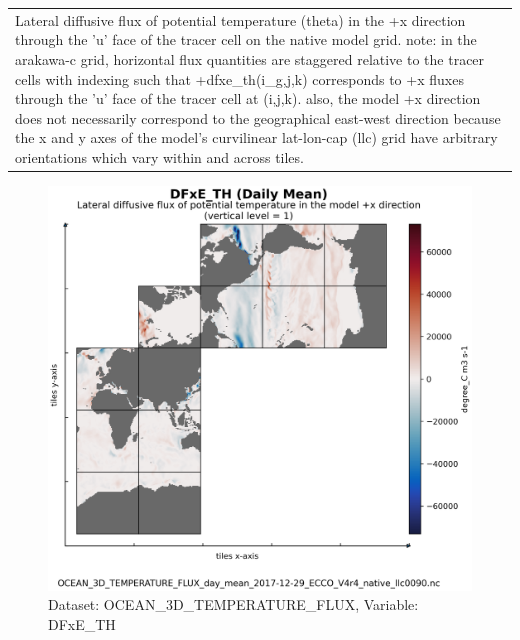 \begin{longtable}{|m{}|m{}|m{}|m{}|}
\rowcolor{lightgray} \multicolumn{4}{|c|}{\textbf{Comments}} \\ \hline
\multicolumn{4}{|p{1\textwidth}|}{\footnotesize{{Lateral diffusive flux of potential temperature (theta) in the +x direction through the 'u' face of the tracer cell on the native model grid. note: in the arakawa-c grid, horizontal flux quantities are staggered relative to the tracer cells with indexing such that +dfxe\_th(i\_g,j,k) corresponds to +x fluxes through the 'u' face of the tracer cell at (i,j,k). also, the model +x direction does not necessarily correspond to the geographical east-west direction because the x and y axes of the model's curvilinear lat-lon-cap (llc) grid have arbitrary orientations which vary within and across tiles.}}} \\ \hline
\end{longtable}

\begin{figure}[H]
\centering
\includegraphics[scale=0.55]{../images/plots/native_plots/Ocean_Three-Dimensional_Potential_Temperature_Fluxes/DFxE_TH.png}
\caption{Dataset: OCEAN\_3D\_TEMPERATURE\_FLUX, Variable: DFxE\_TH}
\label{tab:table-OCEAN_3D_TEMPERATURE_FLUX_DFxE_TH-Plot}
\end{figure}
\newpage
\pagebreak
